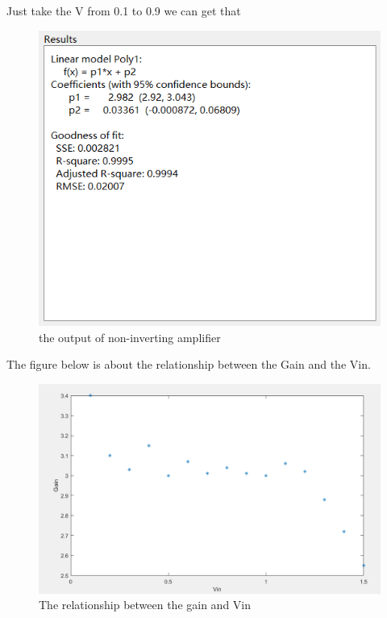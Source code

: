 \documentclass{article}
\begin{document}
Just take the V from 0.1 to 0.9 we can get that 
\begin{figure}[H]
	\centering
	\includegraphics[width=0.7\linewidth]{noninvertingcf}
	\caption{the output of non-inverting amplifier}
	\label{fig:noninvertingcf}
\end{figure}
The figure below is about the relationship between the Gain and the Vin.
\begin{figure}[H]
	\centering
	\includegraphics[width=0.7\linewidth]{gv1}
	\caption{The relationship between the gain and Vin}
	\label{fig:gv1}
\end{figure}
\end{document}
